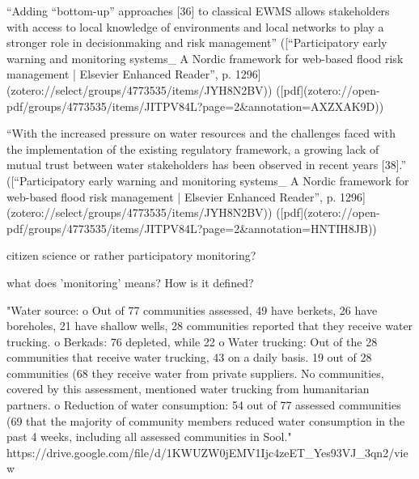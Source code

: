 “Adding “bottom-up” approaches [36] to classical EWMS allows stakeholders with access to local knowledge of environments and local networks to play a stronger role in decisionmaking and risk management” ([“Participatory early warning and monitoring systems_ A Nordic framework for web-based flood risk management | Elsevier Enhanced Reader”, p. 1296](zotero://select/groups/4773535/items/JYH8N2BV)) ([pdf](zotero://open-pdf/groups/4773535/items/JITPV84L?page=2&annotation=AXZXAK9D))

“With the increased pressure on water resources and the challenges faced with the implementation of the existing regulatory framework, a growing lack of mutual trust between water stakeholders has been observed in recent years [38].” ([“Participatory early warning and monitoring systems_ A Nordic framework for web-based flood risk management | Elsevier Enhanced Reader”, p. 1296](zotero://select/groups/4773535/items/JYH8N2BV)) ([pdf](zotero://open-pdf/groups/4773535/items/JITPV84L?page=2&annotation=HNTIH8JB))

citizen science or rather participatory monitoring?


what does 'monitoring' means? How is it defined?

"Water source:
o Out of 77 communities assessed, 49 have berkets, 26 have boreholes, 21 have shallow
wells, 28 communities reported that they receive water trucking.
o Berkads: 76%
depleted, while 22%
o Water trucking: Out of the 28 communities that receive water trucking, 43%
on a daily basis. 19 out of 28 communities (68%
they receive water from private suppliers. No communities, covered by this assessment,
mentioned water trucking from humanitarian partners.
o Reduction of water consumption: 54 out of 77 assessed communities (69%
that the majority of community members reduced water consumption in the past 4 weeks,
including all assessed communities in Sool." https://drive.google.com/file/d/1KWUZW0jEMV1Ijc4zeET_Yes93VJ_3qn2/view


